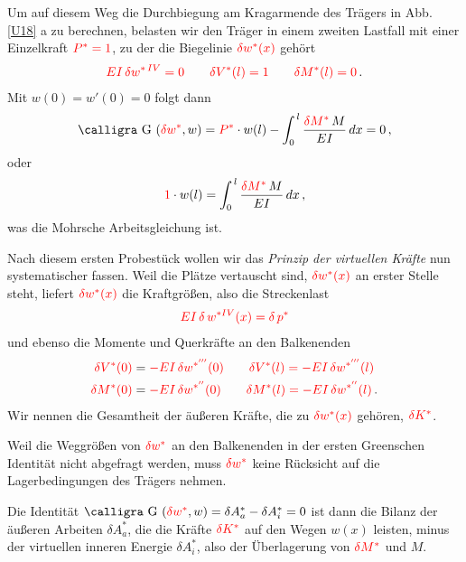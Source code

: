 {{{{Um auf diesem Weg die Durchbiegung am Kragarmende des Tr\"{a}gers in Abb. \ref{U18} a zu berechnen, belasten wir den Tr\"{a}ger in einem zweiten Lastfall mit einer Einzelkraft $\textcolor{red}{P^* = 1}$, zu der die Biegelinie $\textcolor{red}{\delta w^*(x)}$ geh\"{o}rt
\begin{align}
\textcolor{red}{EI\,\delta w^{*\,IV} = 0 \qquad \delta V^*(l) = 1\qquad \delta M^*(l) = 0}\,.
\end{align}
Mit $w(0) = w'(0) = 0 $ folgt dann
\begin{align}
\text{\normalfont\calligra G\,\,}(\textcolor{red}{\delta w^*},w) = \textcolor{red}{P^*} \cdot  w(l) - \int_0^{\,l} \frac{\textcolor{red}{\delta M^*}\,M}{EI}\,dx = 0\,,
\end{align}
oder
\begin{align}
\textcolor{red}{1}\cdot w(l) = \int_0^{\,l} \frac{\textcolor{red}{\delta M^*}\,M}{EI}\,dx\,,
\end{align}
was die Mohrsche Arbeitsgleichung ist.

Nach diesem ersten Probest\"{u}ck wollen wir das {\em Prinzip der virtuellen Kr\"{a}fte\/} nun systematischer fassen. Weil die Pl\"{a}tze vertauscht sind, $\textcolor{red}{\delta w^*(x)}$ an erster Stelle steht,  liefert $\textcolor{red}{\delta w^*(x)} $ die Kraftgr\"{o}{\ss}en, also die Streckenlast
\begin{align}\label{Eq17}
\textcolor{red}{ EI\, \delta\,w^{*IV}(x) = \delta \,p^*}
\end{align}
und ebenso die Momente und Querkr\"{a}fte an den Balkenenden
 \begin{align}\label{Eq18}
\textcolor{red}{\delta V^*(0)} &= \textcolor{red}{- EI\,\delta w^{*'''}(0)} \qquad  \textcolor{red}{\delta V^*(l) = - EI\,\delta w^{*'''}(l)} \nonumber \\
\textcolor{red}{\delta M^*(0)} &= \textcolor{red}{- EI\,\delta w^{*''}(0)} \qquad  \textcolor{red}{\delta M^*(l) = - EI\,\delta w^{*''}(l)}\,.
 \end{align}
Wir nennen die Gesamtheit der \"{a}u{\ss}eren Kr\"{a}fte, die zu $\textcolor{red}{\delta w^*(x)} $ geh\"{o}ren, $\textcolor{red}{\delta K^*}$.

Weil die Weggr\"{o}{\ss}en  von $\textcolor{red}{\delta w^*} $ an den Balkenenden in der ersten Greenschen Identit\"{a}t nicht abgefragt werden,  muss $\textcolor{red}{\delta w^* }$ keine R\"{u}cksicht auf die Lagerbedingungen des Tr\"{a}gers nehmen.

Die Identit\"{a}t $\text{\normalfont\calligra G\,\,}(\textcolor{red}{\delta w^*},w) = \delta A_a^* - \delta A_i^* = 0 $ ist dann die Bilanz der \"{a}u{\ss}eren Arbeiten $\delta A_a^*$, die die Kr\"{a}fte $\textcolor{red}{\delta K^*}$ auf den Wegen $w(x) $ leisten, minus der virtuellen inneren Energie $\delta A_i^*$, also der \"{U}berlagerung von $\textcolor{red}{\delta M^*}$ und $M$.

}}}}
